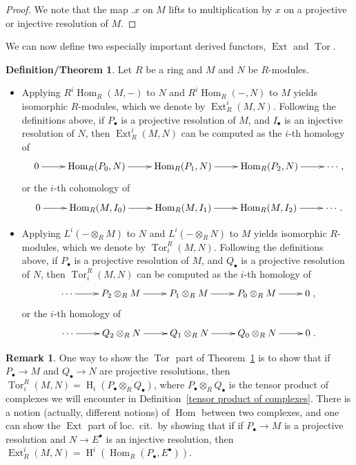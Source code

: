\documentclass[11pt]{book}
\numberwithin{equation}{section}
\numberwithin{theorem}{chapter}
\theoremstyle{definition}
\newtheorem{defthm}[theorem]{Definition/Theorem}
\newtheorem*{basic properties}{Basic Properties}
\newtheorem*{Important Remark}{Important Remark}
\newtheorem{remark}[theorem]{Remark}
\theoremstyle{remark}
\newcommand{\Hom}{\operatorname{Hom}}
\newcommand{\Ext}{\operatorname{Ext}}
\newcommand{\Tor}{\operatorname{Tor}}
\renewcommand{\H}{\operatorname{H}}
\begin{document}
\begin{proof}
	We note that the map $.x$ on $M$ lifts to multiplication by $x$ on a projective or injective resolution of $M$.
\end{proof}


We can now define two especially important derived functors, $\Ext$ and $\Tor$.

\begin{defthm}\label{defExtTor}\index{$\Ext^i_R(M,N)$}\index{$\Tor_i^R(M,N)$}
	Let $R$ be a ring and $M$ and $N$ be $R$-modules.
	
	\begin{itemize}
		\item Applying $R^i\Hom_R(M,-)$ to $N$ and $R^i\Hom_R(-,N)$ to $M$ yields isomorphic $R$-modules, which we denote by $\Ext^i_R(M,N)$. Following the definitions above, if $P_\bullet$ is a projective resolution of $M$, and $I_\bullet$ is an injective resolution of $N$, then $\Ext^i_R(M,N)$ can be computed as the $i$-th homology of
		$$\xymatrix{0 \ar[r] & \Hom_R(P_{0},N) \ar[r] & \Hom_R(P_1,N) \ar[r] & \Hom_R(P_{2},N) \ar[r] & \cdots},$$
		or the $i$-th cohomology of 
		$$\xymatrix{0 \ar[r] & \Hom_R(M,I_{0}) \ar[r] & \Hom_R(M,I_1) \ar[r] & \Hom_R(M,I_{2}) \ar[r] & \cdots}.$$
	
		\item Applying $L^i(-\otimes_R M)$ to $N$ and $L^i(-\otimes_R N)$ to $M$ yields isomorphic $R$-modules, which we denote by $\Tor_i^R(M,N)$. Following the definitions above, if $P_\bullet$ is a projective resolution of $M$, and $Q_\bullet$ is a projective resolution of $N$, then $\Tor_i^R(M,N)$ can be computed as the $i$-th homology of
		$$\xymatrix{\cdots \ar[r] & P_2 \otimes_R M \ar[r] & P_1 \otimes_R M \ar[r] & P_0 \otimes_R M \ar[r] & 0},$$
		or the $i$-th homology of 
		$$\xymatrix{\cdots \ar[r] & Q_2 \otimes_R N \ar[r] & Q_1 \otimes_R N \ar[r] & Q_0 \otimes_R N \ar[r] & 0}.$$
	
	\end{itemize}
\end{defthm}





\begin{remark}
	One way to show the $\Tor$ part of Theorem~\ref{defExtTor} is to show that if $P_\bullet\to M$ and $Q_\bullet\to N$ are projective resolutions, then $\Tor_i^R(M,N)=\H_i(P_\bullet \otimes_R Q_\bullet)$, where $P_\bullet \otimes_R Q_\bullet$ is the tensor product of complexes we will encounter in Definition~\ref{tensor product of complexes}. There is a notion (actually, different notions) of $\Hom$ between two complexes, and one can show the $\Ext$ part of loc.~cit.~by showing that if if $P_\bullet\to M$ is a projective resolution and $N \to E^\bullet$ is an injective resolution, then $\Ext^i_R(M,N)=\H^i(\Hom_R(P_\bullet,E^\bullet))$.
\end{remark}
\end{document}
